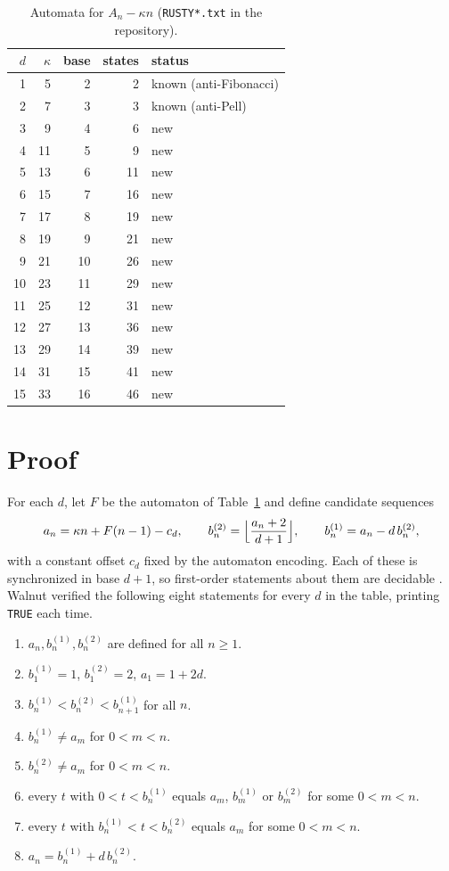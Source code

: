 \documentclass[11pt]{article}
\theoremstyle{remark}\newtheorem{remark}[theorem]{Remark}
\begin{document}
\begin{table}[h]\centering
\begin{tabular}{rrrrl}\toprule
\(d\) & \(\kappa\) & base & states & status\\\midrule
1&5&2&2&known (anti-Fibonacci)\\
2&7&3&3&known (anti-Pell)\\
3&9&4&6&new\\
4&11&5&9&new\\
5&13&6&11&new\\
6&15&7&16&new\\
7&17&8&19&new\\
8&19&9&21&new\\
9&21&10&26&new\\
10&23&11&29&new\\
11&25&12&31&new\\
12&27&13&36&new\\
13&29&14&39&new\\
14&31&15&41&new\\
15&33&16&46&new\\\bottomrule
\end{tabular}
\caption{Automata for \(A_n-\kappa n\) (\texttt{RUSTY*.txt} in the repository).}\label{tab}
\end{table}

\section{Proof}
For each \(d\), let \(F\) be the automaton of Table~\ref{tab} and define candidate sequences
\[
a_n=\kappa n+F(n-1)-c_d,\qquad b^{(2)}_n=\Bigl\lfloor\frac{a_n+2}{d+1}\Bigr\rfloor,\qquad b^{(1)}_n=a_n-d\,b^{(2)}_n,
\]
with a constant offset \(c_d\) fixed by the automaton encoding. Each of these is synchronized in base \(d+1\), so first-order statements about them are decidable \cite{shallit}. Walnut \cite{walnut} verified the following eight statements for every \(d\) in the table, printing \texttt{TRUE} each time.
\begin{enumerate}
\item[(T)] \(a_n,b^{(1)}_n,b^{(2)}_n\) are defined for all \(n\ge1\).
\item[(I)] \(b^{(1)}_1=1\), \(b^{(2)}_1=2\), \(a_1=1+2d\).
\item[(O)] \(b^{(1)}_n<b^{(2)}_n<b^{(1)}_{n+1}\) for all \(n\).
\item[(N1)] \(b^{(1)}_n\ne a_m\) for \(0<m<n\).
\item[(N2)] \(b^{(2)}_n\ne a_m\) for \(0<m<n\).
\item[(M1)] every \(t\) with \(0<t<b^{(1)}_n\) equals \(a_m\), \(b^{(1)}_m\) or \(b^{(2)}_m\) for some \(0<m<n\).
\item[(M2)] every \(t\) with \(b^{(1)}_n<t<b^{(2)}_n\) equals \(a_m\) for some \(0<m<n\).
\item[(S)] \(a_n=b^{(1)}_n+d\,b^{(2)}_n\).
\end{enumerate}
\end{document}
